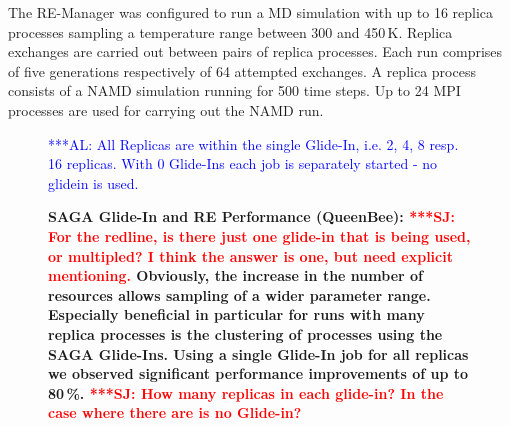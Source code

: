 \documentclass{rspublic}
\newcommand{\alnote}[1]{ {\textcolor{blue} { ***AL: #1 }}}
\newcommand{\jhanote}[1]{ {\textcolor{red} { ***SJ: #1 }}}
\newcommand{\alnote}[1]{}
\newcommand{\jhanote}[1]{}
\begin{document}
{The RE-Manager was configured to run a MD simulation with up to 16
replica processes sampling a temperature range between 300 and
450\,K. Replica exchanges are carried out between pairs of replica
processes. Each run comprises of five generations respectively of 64
attempted exchanges.  A replica process consists of a NAMD simulation
running for 500 time steps. Up to 24 MPI processes are used for
carrying out the NAMD run.

\begin{figure}[th]
    \centering      
        \caption{\footnotesize \bf SAGA Glide-In and RE Performance
          (QueenBee): \jhanote{For the redline, is there just one
            glide-in that is being used, or multipled? I think the
            answer is one, but need explicit mentioning.} 
          Obviously,
          the increase in the number of resources allows sampling of a
          wider parameter range. Especially beneficial in particular
          for runs with many replica processes is the clustering of
          processes using the SAGA Glide-Ins. Using a single Glide-In
          job for all replicas we observed significant performance 
          improvements of up to 80\,\%.
          \jhanote{How many
            replicas in each glide-in? In the case where there are is
            no Glide-in?}}     
           \alnote{All Replicas are within the single Glide-In, i.e. 2, 4, 8 resp. 16 replicas.
           With 0 Glide-Ins each job is separately started - no glidein is used.}
    \label{fig:perf_remd_glidin}
\end{figure} 

}
\end{document}
